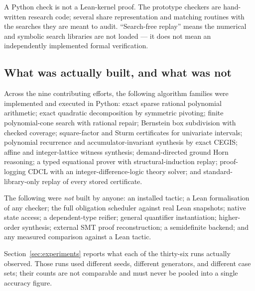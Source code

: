 \begin{remark}
A Python check is not a Lean-kernel proof. The prototype checkers are
hand-written research code; several share representation and matching routines
with the searches they are meant to audit. ``Search-free replay'' means the
numerical and symbolic search libraries are not loaded --- it does not mean an
independently implemented formal verification.
\end{remark}

\subsection{What was actually built, and what was not}

Across the nine contributing efforts, the following algorithm families were
implemented and executed in Python: exact sparse rational polynomial
arithmetic; exact quadratic decomposition by symmetric pivoting; finite
polynomial-cone search with rational repair; Bernstein box subdivision with
checked coverage; square-factor and Sturm certificates for univariate
intervals; polynomial recurrence and accumulator-invariant synthesis by exact
CEGIS; affine and integer-lattice witness synthesis; demand-directed ground
Horn reasoning; a typed equational prover with structural-induction replay;
proof-logging CDCL with an integer-difference-logic theory solver; and
standard-library-only replay of every stored certificate.

The following were \emph{not} built by anyone: an installed 
tactic; a Lean formalisation of any checker; the full obligation scheduler
against real Lean snapshots; native \grind{} state access; a dependent-type
reifier; general quantifier instantiation; higher-order synthesis; external
SMT proof reconstruction; a semidefinite backend; and any measured comparison
against a Lean tactic.

Section~\ref{sec:experiments} reports what each of the thirty-six runs
actually observed. Those runs used different seeds, different generators, and different
case sets; their counts are not comparable and must never be pooled into a
single accuracy figure.
